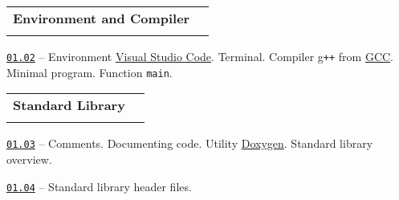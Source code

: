 \documentclass[a4paper,12pt]{article}
\renewenvironment{itemize}
{
    \begin{list}{\labelitemi}
    {
      \setlength{\topsep}{0pt}
      \setlength{\partopsep}{0pt}
      \setlength{\parskip}{0pt}
      \setlength{\itemsep}{0pt}
      \setlength{\parsep}{0pt}
      \setlength{\leftmargin}{14.5pt}
    }
}{\end{list}}
\begin{document}
\bigskip\medskip

\begin{tabular}{!{\vrule width 1pt}L{5.3cm}!{\vrule width 1pt}L{13.7cm}!{\vrule width 0pt}} 


\textbf{Environment and Compiler} & \\


\end{tabular}

\medskip\smallskip

\begin{itemize}

    \item \href{https://github.com/i-s-m-mipt/Education/blob/master/projects/examples/source/01.02.cpp}{\texttt{01.02}} -- Environment \href{https://code.visualstudio.com/}{Visual Studio Code}. Terminal. Compiler g\texttt{++} from \href{https://gcc.gnu.org/}{GCC}. Minimal program. Function \lstinline{main}.
    
\end{itemize}

\bigskip\medskip

\begin{tabular}{!{\vrule width 1pt}L{3.3cm}!{\vrule width 1pt}L{15.7cm}!{\vrule width 0pt}} 


\textbf{Standard Library} & \\


\end{tabular}

\medskip\smallskip

\begin{itemize}

    \item \href{https://github.com/i-s-m-mipt/Education/blob/master/projects/examples/source/01.03.cpp}{\texttt{01.03}} -- Comments. Documenting code. Utility \href{https://doxygen.nl/}{Doxygen}. Standard library overview.

    \smallskip

    \item \href{https://github.com/i-s-m-mipt/Education/blob/master/projects/examples/source/01.04.hpp}{\texttt{01.04}} -- Standard library header files.
    
\end{itemize}
\end{document}

